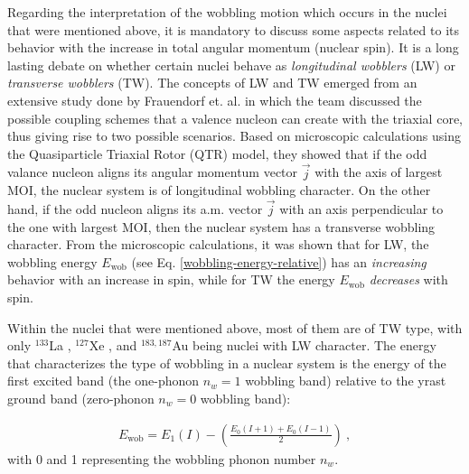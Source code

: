 \documentclass[11pt]{article}
\begin{document}
Regarding the interpretation of the wobbling motion which occurs in the nuclei that were mentioned above, it is mandatory to discuss some aspects related to its behavior with the increase in total angular momentum (nuclear spin). It is a long lasting debate on whether certain nuclei behave as \emph{longitudinal wobblers} (LW) or \emph{transverse wobblers} (TW). The concepts of LW and TW emerged from an extensive study done by Frauendorf et. al. \cite{frauendorf2014transverse} in which the team discussed the possible coupling schemes that a valence nucleon can create with the triaxial core, thus giving rise to two possible scenarios. Based on microscopic calculations using the Quasiparticle Triaxial Rotor (QTR) model, they showed that if the odd valance nucleon aligns its angular momentum vector $\vec{j}$ with the axis of largest MOI, the nuclear system is of longitudinal wobbling character. On the other hand, if the odd nucleon aligns its a.m. vector $\vec{j}$ with an axis perpendicular to the one with largest MOI, then the nuclear system has a transverse wobbling character. From the microscopic calculations, it was shown that for LW, the wobbling energy $E_\text{wob}$ (see Eq. \ref{wobbling-energy-relative}) has an \emph{increasing} behavior with an increase in spin, while for TW the energy $E_\text{wob}$ \emph{decreases} with spin.

Within the nuclei that were mentioned above, most of them are of TW type, with only $^{133}$La \cite{biswas2019longitudinal}, $^{127}$Xe \cite{chakraborty2020multiphonon}, and $^{183,187}$Au \cite{nandi2020first,sensharma2020longitudinal} being nuclei with LW character. The energy that characterizes the type of wobbling in a nuclear system is the energy of the first excited band (the one-phonon $n_w=1$ wobbling band) relative to the yrast ground band (zero-phonon $n_w=0$ wobbling band):

\begin{align}
    E_\text{wob}=E_{1}(I)-\left(\frac{E_0(I+1)+E_0(I-1)}{2}\right)\ ,
    \label{wobbling-energy-relative}
\end{align}
with 0 and 1 representing the wobbling phonon number $n_w$.
\end{document}
